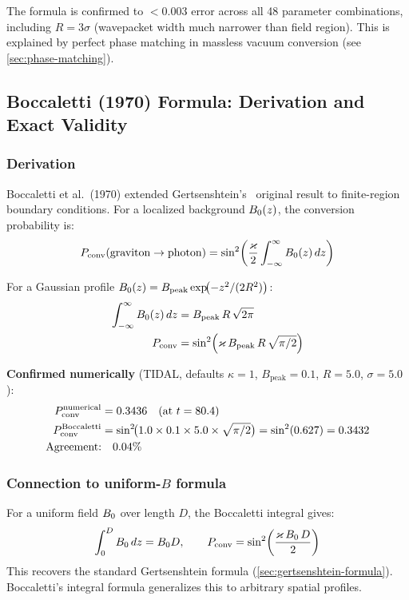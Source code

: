 The formula is confirmed to $< 0.003$ error across all 48 parameter combinations, including
$R = 3\sigma$ (wavepacket width much narrower than field region). This is explained by perfect
phase matching in massless vacuum conversion (see \cref{sec:phase-matching}).


\subsection{Boccaletti (1970) Formula: Derivation and Exact Validity}
\label{sec:boccaletti-derivation}

\subsubsection{Derivation}

Boccaletti et al.\ (1970) extended Gertsenshtein's~\cite{gertsenshtein1962wave} original result to finite-region
boundary conditions. For a localized background $B_0(z)$, the conversion probability is:
\begin{equation}
  P_\mathrm{conv}(\text{graviton} \to \text{photon}) = \sin^2\!\left(\frac{\varkappa}{2} \int_{-\infty}^{\infty} B_0(z)\, dz\right)
\end{equation}

For a Gaussian profile $B_0(z) = B_\text{peak} \exp\!\bigl(-z^2/(2R^2)\bigr)$:
\begin{align}
  \int_{-\infty}^{\infty} B_0(z)\, dz &= B_\text{peak}\, R\, \sqrt{2\pi} \\
  P_\mathrm{conv} &= \sin^2\!\left(\varkappa\, B_\text{peak}\, R\, \sqrt{\pi/2}\right)
\end{align}

\textbf{Confirmed numerically} (TIDAL, defaults $\kappa=1$, $B_\text{peak}=0.1$, $R=5.0$, $\sigma=5.0$):
\begin{align}
  P_\mathrm{conv}^\text{numerical} &= 0.3436 \quad (\text{at } t=80.4) \notag \\
  P_\mathrm{conv}^\text{Boccaletti} &= \sin^2\!\bigl(1.0 \times 0.1 \times 5.0 \times \sqrt{\pi/2}\bigr) = \sin^2(0.627) = 0.3432 \notag \\
  \text{Agreement:} &\quad 0.04\% \notag
\end{align}

\subsubsection{Connection to uniform-$B$ formula}

For a uniform field $B_0$ over length $D$, the Boccaletti integral gives:
\begin{equation}
  \int_0^D B_0\, dz = B_0 D, \qquad
  P_\mathrm{conv} = \sin^2\!\left(\frac{\varkappa\, B_0\, D}{2}\right)
\end{equation}
This recovers the standard Gertsenshtein formula (\cref{sec:gertsenshtein-formula}). Boccaletti's integral formula generalizes
this to arbitrary spatial profiles.


